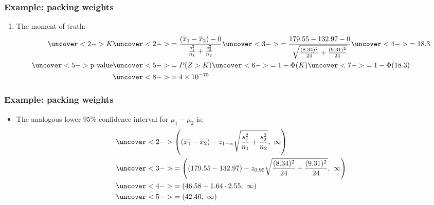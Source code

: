\documentclass[handout]{beamer}\usepackage{graphicx, color}
\providecommand{\ov}[1]{\overline{#1}}
\numberwithin{equation}{section}
\begin{document}
\begin{frame}
\frametitle{Example: packing weights}
\begin{enumerate}[1. ]
 \setcounter{enumi}{\value{saveenum}}
\item The moment of truth:
\begin{align*}
\uncover<2->{K} & \uncover<2->{= \frac{(\ov{x}_1 - \ov{x}_2) - 0}{\frac{s^2_1}{n_1} + \frac{s^2_2}{n_2}}} \uncover<3->{ = \frac{179.55 - 132.97 - 0}{\sqrt{\frac{(8.34)^2}{24} + \frac{(9.31)^2}{24}}}} \uncover<4->{ = 18.3} \\
\uncover<5->{\text{p-value}} & \uncover<5->{= P(Z > K)} \uncover<6->{ = 1 - \Phi(K)} \uncover<7->{ = 1 - \Phi(18.3)} \\
&\uncover<8->{= 4 \times 10^{-75}}
\end{align*}
\end{enumerate}
\end{frame}

\begin{frame}
\frametitle{Example: packing weights}
\begin{itemize}
\item The analogous lower 95\% confidence interval for $\mu_1 - \mu_2$ is:
\begin{align*}
&\uncover<2->{\left ((\ov{x_1} - \ov{x}_2) - z_{1 - \alpha} \sqrt{\frac{s^2_1}{n_1} + \frac{s^2_2}{n_2}}, \ \infty \right )}  \\
&\uncover<3->{= \left ((179.55 - 132.97) - z_{0.95} \sqrt{\frac{(8.34)^2}{24} + \frac{(9.31)^2}{24}}, \ \infty \right )} \\
&\uncover<4->{= (46.58 - 1.64 \cdot 2.55, \ \infty)} \\
&\uncover<5->{= (42.40, \ \infty)}
\end{align*}
\end{itemize}
\end{frame}
\end{document}
